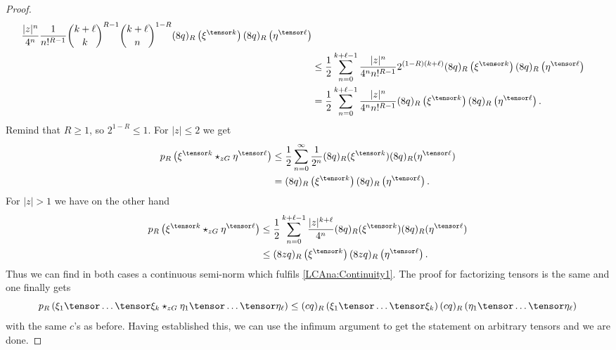 \begin{proof}
\begin{align}
        \frac{|z|^n}{4^n}
        \frac{1}{n!^{R - 1}}
        \binom{k + \ell}{k}^{R - 1}
        \binom{k + \ell}{n}^{1 - R}
        (8 q)_R \left( \xi^{\tensor k} \right)
        (8 q)_R \left( \eta^{\tensor \ell} \right)
        \\
        \nonumber
        & \leq
        \frac{1}{2}
        \sum\limits_{n=0}^{k + \ell - 1}
        \frac{|z|^n}{4^n n!^{R - 1}}
        2^{(1-R)(k + \ell)}
        (8 q)_R \left( \xi^{\tensor k} \right)
        (8 q)_R \left( \eta^{\tensor \ell} \right)
        \\
        \nonumber
        & =
        \frac{1}{2}
        \sum\limits_{n=0}^{k + \ell - 1}
        \frac{|z|^n}{4^n n!^{R - 1}}
        (8 q)_R \left( \xi^{\tensor k} \right)
        (8 q)_R \left( \eta^{\tensor \ell} \right).
    \end{align}
    Remind that $R \geq 1$, so $2^{1-R} \leq 1$. For $|z| \leq 2$ we get
    \begin{align*}
        \nonumber
        p_R \left(
            \xi^{\tensor k} \ostar_{zG} \eta^{\tensor \ell}
        \right)
        & \leq
        \frac{1}{2}
        \sum\limits_{n=0}^{\infty}
        \frac{1}{2^n}
        (8 q)_R(\xi^{\tensor k})
        (8 q)_R(\eta^{\tensor \ell})
        \\
        & =
        (8 q)_R \left( \xi^{\tensor k} \right)
        (8 q)_R \left( \eta^{\tensor \ell} \right).
    \end{align*}
    For $|z| > 1$ we have on the other hand
    \begin{align*}
        \nonumber
        p_R \left(
            \xi^{\tensor k} \ostar_{zG} \eta^{\tensor \ell}
        \right)
        & \leq
        \frac{1}{2}
        \sum\limits_{n=0}^{k + \ell - 1}
        \frac{|z|^{k + \ell}}{4^n}
        (8 q)_R(\xi^{\tensor k})
        (8 q)_R(\eta^{\tensor \ell})
        \\
        & \leq
        (8z q)_R \left( \xi^{\tensor k} \right)
        (8z q)_R \left( \eta^{\tensor \ell} \right).
    \end{align*}
    Thus we can find in both cases a continuous semi-norm which
    fulfils \eqref{LCAna:Continuity1}. The proof for factorizing
    tensors is the same and one finally gets
    \begin{equation*}
    	p_R
    	\left(
    		\xi_1 \tensor \ldots \tensor \xi_k
    		\star_{zG}
    		\eta_1 \tensor \ldots \tensor \eta_{\ell}
    	\right)
    	\leq
    	(c q)_R
    	\left(
    		\xi_1 \tensor \ldots \tensor \xi_k
    	\right)
    	(c q)_R
    	\left(
    		\eta_1 \tensor \ldots \tensor \eta_{\ell}
    	\right)
    \end{equation*}
    with the same $c$'s as before. Having established this, we can use 
    the infimum argument to get the statement on arbitrary tensors
    and we are done.
\end{proof}
